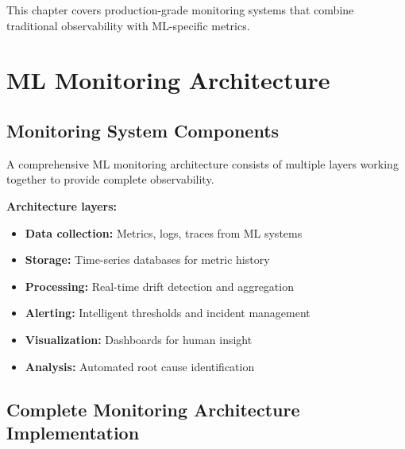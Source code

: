 This chapter covers production-grade monitoring systems that combine traditional observability with ML-specific metrics.

\section{ML Monitoring Architecture}

\subsection{Monitoring System Components}

A comprehensive ML monitoring architecture consists of multiple layers working together to provide complete observability.

\textbf{Architecture layers:}
\begin{itemize}
    \item \textbf{Data collection:} Metrics, logs, traces from ML systems
    \item \textbf{Storage:} Time-series databases for metric history
    \item \textbf{Processing:} Real-time drift detection and aggregation
    \item \textbf{Alerting:} Intelligent thresholds and incident management
    \item \textbf{Visualization:} Dashboards for human insight
    \item \textbf{Analysis:} Automated root cause identification
\end{itemize}

\subsection{Complete Monitoring Architecture Implementation}

